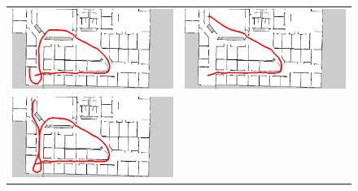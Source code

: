 \newpage
\begin{figure}[h]
  \begin{tabular}{cc}
    \begin{minipage}[h]{0.45\hsize}
      \centering
      \includegraphics[keepaspectratio, scale=0.3]{images/exp1.2_10000_5.png}
    \end{minipage} &
    \begin{minipage}[h]{0.45\hsize}
      \centering
      \includegraphics[keepaspectratio, scale=0.3]{images/exp1.2_10000_7.png}
    \end{minipage} \\
    \begin{minipage}[h]{0.45\hsize}
      \centering
      \includegraphics[keepaspectratio, scale=0.3]{images/exp1.2_10000_8.png}

\end{minipage}
\end{tabular}
\end{figure}
